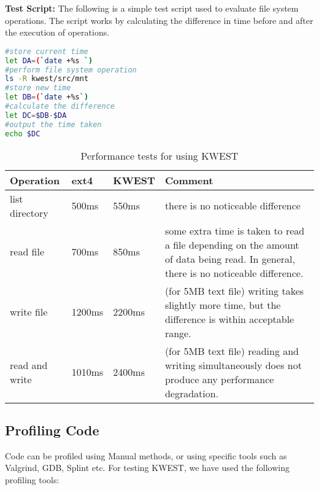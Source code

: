 \textbf{Test Script:} The following is a simple test script used to evaluate file system operations. The script works by calculating the difference in time before and after the execution of operations.
\begin{lstlisting}[language=bash,frame=single]
#store current time
let DA=(`date +%s `)
#perform file system operation
ls -R kwest/src/mnt
#store new time
let DB=(`date +%s`)
#calculate the difference
let DC=$DB-$DA
#output the time taken
echo $DC
\end{lstlisting}

\begin{table}[h]
\begin{tabular}{|p{2cm}|p{1.5cm}|p{1.5cm}|p{7cm}|}
\hline
\textbf{Operation} & \textbf{ext4} & \textbf{KWEST} & \textbf{Comment} \\ \hline
list directory	&	500ms	&	550ms & there is no noticeable difference \\ \hline
read file	&	700ms & 850ms	& some extra time is taken to read a file depending on the amount of data being read. In general, there is no noticeable difference. \\ \hline
write file	&	1200ms & 2200ms	& (for 5MB text file) writing takes slightly more time, but the difference is within acceptable range. \\ \hline
read and write	&	1010ms & 2400ms & (for 5MB text file) reading and writing simultaneously does not produce any performance degradation. \\
\hline
\end{tabular}
\caption{Performance tests for using KWEST}
\label{performancetests}
\end{table}

\subsection{Profiling Code}
Code can be profiled using Manual methods, or using specific tools such as Valgrind, GDB, Splint etc. For testing KWEST, we have used the following profiling tools:
